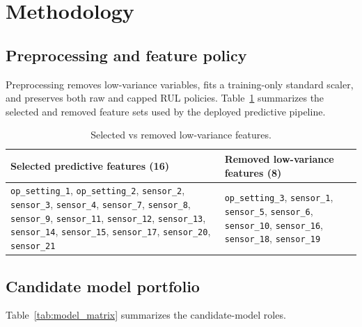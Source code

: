 \documentclass[11pt]{article}
\begin{document}
\section{Methodology}
\subsection{Preprocessing and feature policy}
Preprocessing removes low-variance variables, fits a training-only standard scaler, and preserves both raw and capped RUL policies. Table~\ref{tab:features} summarizes the selected and removed feature sets used by the deployed predictive pipeline.

\begin{table}[H]
\centering
\caption{Selected vs removed low-variance features.}
\label{tab:features}
\begin{tabularx}{\textwidth}{>{\raggedright\arraybackslash}X>{\raggedright\arraybackslash}X}
\toprule
Selected predictive features (16) & Removed low-variance features (8) \\
\midrule
\texttt{op\_setting\_1}, \texttt{op\_setting\_2}, \texttt{sensor\_2}, \texttt{sensor\_3}, \texttt{sensor\_4}, \texttt{sensor\_7}, \texttt{sensor\_8}, \texttt{sensor\_9}, \texttt{sensor\_11}, \texttt{sensor\_12}, \texttt{sensor\_13}, \texttt{sensor\_14}, \texttt{sensor\_15}, \texttt{sensor\_17}, \texttt{sensor\_20}, \texttt{sensor\_21} &
\texttt{op\_setting\_3}, \texttt{sensor\_1}, \texttt{sensor\_5}, \texttt{sensor\_6}, \texttt{sensor\_10}, \texttt{sensor\_16}, \texttt{sensor\_18}, \texttt{sensor\_19} \\
\bottomrule
\end{tabularx}
\end{table}

\subsection{Candidate model portfolio}
Table~\ref{tab:model_matrix} summarizes the candidate-model roles.

\end{document}
